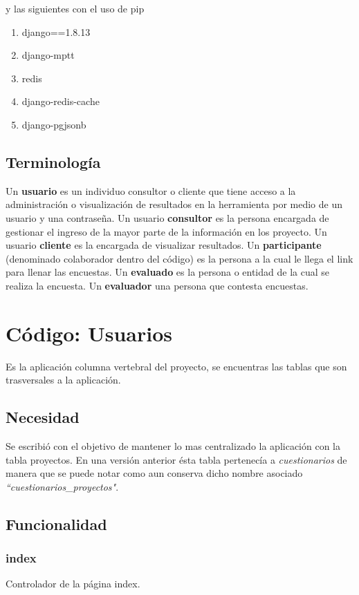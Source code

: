 \documentclass[10pt,a4paper]{book}
\begin{document}
	y las siguientes con el uso de pip
	\begin{enumerate}
		\item django==1.8.13 
		\item django-mptt 
		\item redis 
		\item django-redis-cache
		\item django-pgjsonb
	\end{enumerate}
	
	\section{Terminología}
	Un \textbf{usuario} es un individuo consultor o cliente que tiene acceso a la administración o visualización de resultados en la herramienta por medio de un usuario y una contraseña. Un usuario \textbf{consultor} es la persona encargada de gestionar el ingreso de la mayor parte de la información en los proyecto. Un usuario \textbf{cliente} es la encargada de visualizar resultados. Un \textbf{participante} (denominado colaborador dentro del código) es la persona a la cual le llega el link para llenar las encuestas. Un \textbf{evaluado} es la persona o entidad de la cual se realiza la encuesta. Un \textbf{evaluador} una persona que contesta encuestas.
	
	\chapter{Código: Usuarios}
		
	Es la aplicación columna vertebral del proyecto, se encuentras las tablas que son trasversales a la aplicación.

	\section{Necesidad}
	
	Se escribió con el objetivo de mantener lo mas centralizado la aplicación con la tabla proyectos. En una versión anterior ésta tabla pertenecía a \textit{cuestionarios} de manera que se puede notar como aun conserva dicho nombre asociado \textit{``cuestionarios\_proyectos"}. 
	
	\section{Funcionalidad}
	
	\subsection{index}
	Controlador de la página index.
		
\end{document}
